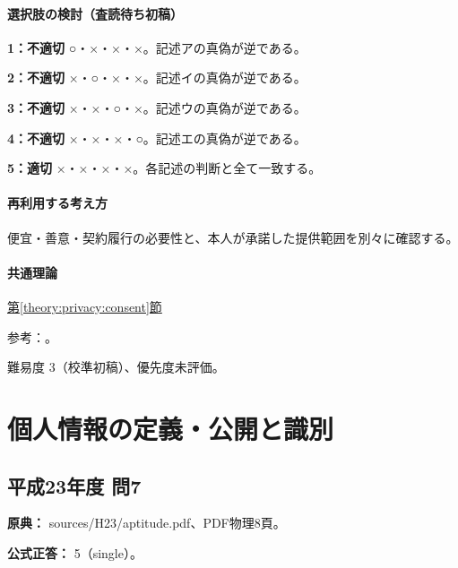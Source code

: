 \paragraph{選択肢の検討（査読待ち初稿）}\mbox{}\par

\noindent\textbf{1：不適切} ○・×・×・×。記述アの真偽が逆である。\par

\noindent\textbf{2：不適切} ×・○・×・×。記述イの真偽が逆である。\par

\noindent\textbf{3：不適切} ×・×・○・×。記述ウの真偽が逆である。\par

\noindent\textbf{4：不適切} ×・×・×・○。記述エの真偽が逆である。\par

\noindent\textbf{5：適切} ×・×・×・×。各記述の判断と全て一致する。\par

\paragraph{再利用する考え方} 便宜・善意・契約履行の必要性と、本人が承諾した提供範囲を別々に確認する。

\paragraph{共通理論} \hyperref[theory:privacy:consent]{第\ref*{theory:privacy:consent}節}

\par 参考：\cite{privacy_general,privacy_consent2017,privacy_consent_current}。

\par 難易度 3（校準初稿）、優先度未評価。

\section{個人情報の定義・公開と識別}

\subsection{平成23年度 問7}
\label{q:h23-reg-apt-07}

\noindent\textbf{原典：} sources/H23/aptitude.pdf、PDF物理8頁。

\textbf{公式正答：} 5（single）。

